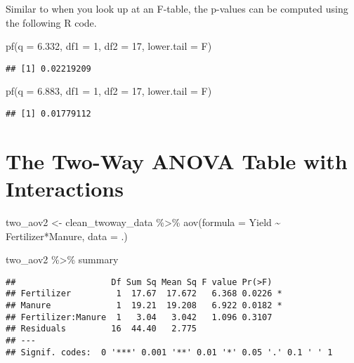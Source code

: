 \documentclass[
]{book}
\newenvironment{Shaded}{\begin{snugshade}}{\end{snugshade}}
\newcommand{\AttributeTok}[1]{\textcolor[rgb]{0.77,0.63,0.00}{#1}}
\newcommand{\DecValTok}[1]{\textcolor[rgb]{0.00,0.00,0.81}{#1}}
\newcommand{\FloatTok}[1]{\textcolor[rgb]{0.00,0.00,0.81}{#1}}
\newcommand{\FunctionTok}[1]{\textcolor[rgb]{0.00,0.00,0.00}{#1}}
\newcommand{\NormalTok}[1]{#1}
\newcommand{\OtherTok}[1]{\textcolor[rgb]{0.56,0.35,0.01}{#1}}
\newcommand{\SpecialCharTok}[1]{\textcolor[rgb]{0.00,0.00,0.00}{#1}}
\begin{document}
Similar to when you look up at an F-table, the p-values can be computed using the following R code.

\begin{Shaded}
\begin{Highlighting}[]
\FunctionTok{pf}\NormalTok{(}\AttributeTok{q =} \FloatTok{6.332}\NormalTok{, }\AttributeTok{df1 =} \DecValTok{1}\NormalTok{, }\AttributeTok{df2 =} \DecValTok{17}\NormalTok{, }\AttributeTok{lower.tail =}\NormalTok{ F)}
\end{Highlighting}
\end{Shaded}

\begin{verbatim}
## [1] 0.02219209
\end{verbatim}

\begin{Shaded}
\begin{Highlighting}[]
\FunctionTok{pf}\NormalTok{(}\AttributeTok{q =} \FloatTok{6.883}\NormalTok{, }\AttributeTok{df1 =} \DecValTok{1}\NormalTok{, }\AttributeTok{df2 =} \DecValTok{17}\NormalTok{, }\AttributeTok{lower.tail =}\NormalTok{ F)}
\end{Highlighting}
\end{Shaded}

\begin{verbatim}
## [1] 0.01779112
\end{verbatim}

\hypertarget{the-two-way-anova-table-with-interactions}{%
\section{The Two-Way ANOVA Table with Interactions}\label{the-two-way-anova-table-with-interactions}}

\begin{Shaded}
\begin{Highlighting}[]
\NormalTok{two\_aov2 }\OtherTok{\textless{}{-}}\NormalTok{ clean\_twoway\_data }\SpecialCharTok{\%\textgreater{}\%} 
  \FunctionTok{aov}\NormalTok{(}\AttributeTok{formula =}\NormalTok{ Yield }\SpecialCharTok{\textasciitilde{}}\NormalTok{ Fertilizer}\SpecialCharTok{*}\NormalTok{Manure, }\AttributeTok{data =}\NormalTok{ .)}
  
\NormalTok{two\_aov2 }\SpecialCharTok{\%\textgreater{}\%} 
\NormalTok{  summary}
\end{Highlighting}
\end{Shaded}

\begin{verbatim}
##                   Df Sum Sq Mean Sq F value Pr(>F)  
## Fertilizer         1  17.67  17.672   6.368 0.0226 *
## Manure             1  19.21  19.208   6.922 0.0182 *
## Fertilizer:Manure  1   3.04   3.042   1.096 0.3107  
## Residuals         16  44.40   2.775                 
## ---
## Signif. codes:  0 '***' 0.001 '**' 0.01 '*' 0.05 '.' 0.1 ' ' 1
\end{verbatim}
\end{document}
